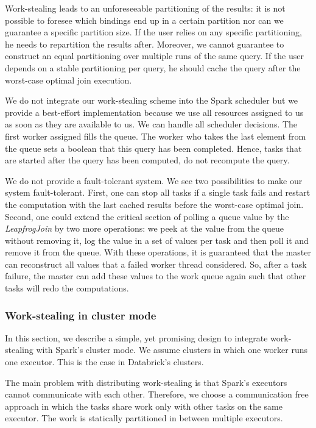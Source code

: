 Work-stealing leads to an unforeseeable partitioning of the results: it is not possible to foresee which bindings end up in a certain
partition nor can we guarantee a specific partition size.
If the user relies on any specific partitioning, he needs to repartition the results after.
Moreover, we cannot guarantee to construct an equal partitioning over multiple runs of the same query.
If the user depends on a stable partitioning per query, he should cache the query after the worst-case optimal join execution.

We do not integrate our work-stealing scheme into the Spark scheduler but we provide a best-effort implementation because
we use all resources assigned to us as soon as they are available to us.
We can handle all scheduler decisions.
The first worker assigned fills the queue.
The worker who takes the last element from the queue sets a boolean that this query has been completed.
Hence, tasks that are started after the query has been computed, do not recompute the query.

We do not provide a fault-tolerant system.
We see two possibilities to make our system fault-tolerant.
First, one can stop all tasks if a single task fails and restart the computation with the last cached results before the worst-case
optimal join.
Second, one could extend the critical section of polling a queue value by the \textit{LeapfrogJoin} by two more operations: we peek
at the value from the queue without removing it, log the value in a set of values per task and then poll it and remove it from the queue.
With these operations, it is guaranteed that the master can reconstruct all values that a failed worker thread considered.
So, after a task failure, the master can add these values to the work queue again such that other tasks will redo the computations.

\subsubsection{Work-stealing in cluster mode} \label{subsubsec:distributed-work-stealing}
In this section, we describe a simple, yet promising design to integrate work-stealing with Spark's cluster mode.
We assume clusters in which one worker runs one executor.
This is the case in Databrick's clusters.

The main problem with distributing work-stealing is that Spark's executors cannot communicate with each other.
Therefore, we choose a communication free approach in which the tasks share work only with other tasks on the same
executor.
The work is statically partitioned in between multiple executors.

